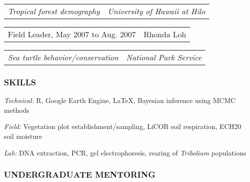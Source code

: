 \documentclass[11pt,english]{article}
\providecommand{\tabularnewline}{\\}
\begin{document}
\begin{tabular}{>{\raggedright}p{3.25in}>{\raggedleft}p{2.75in}}
\hspace{1.5em}\emph{Tropical forest demography} & \emph{University of Hawaii at Hilo}\tabularnewline
\end{tabular}
\vspace{-2ex}

\begin{tabular}{>{\raggedright}p{3in}>{\raggedleft}p{3in}}
Field Leader, May 2007 to Aug. 2007 & Rhonda Loh\tabularnewline
\end{tabular}

\begin{tabular}{>{\raggedright}p{3in}>{\raggedleft}p{3in}}
\hspace{1.5em}\emph{Sea turtle behavior/conservation} & \emph{National Park Service}
\end{tabular}


\vspace{1.5ex}
\subsubsection*{SKILLS}
\vspace{-0.5ex}

\begin{hangparas}{0.25in}{1}
\hspace{0.575em}\emph{Technical:} R, Google Earth Engine, \LaTeX{}, Bayesian inference using MCMC methods

\hspace{0.575em}\emph{Field:} Vegetation plot establishment/sampling, LiCOR soil respiration, ECH20 soil moisture 

\hspace{0.575em}\emph{Lab:} DNA extraction, PCR, gel electrophoresis, rearing of \emph{Tribolium} populations

\end{hangparas}
\vspace{1ex}


\vspace{1.5ex}
\subsubsection*{UNDERGRADUATE MENTORING}
\vspace{-0.5ex}
\end{document}
